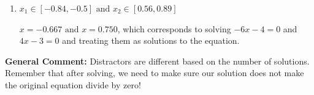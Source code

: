 \documentclass{extbook}[14pt]
\begin{document}
\begin{enumerate}
{\begin{enumerate}[label=\Alph*.]
* The equation leads to solving $19x^{2} +15 x + 16=0$, which leads to complex solutions. This is the correct option.
\item \( x_1 \in [-0.84, -0.5] \text{ and } x_2 \in [0.56,0.89] \)

$x = -0.667 \text{ and } x = 0.750$, which corresponds to solving $-6x -4 = 0$ and $4x -3 = 0$ and treating them as solutions to the equation.
\end{enumerate}

\textbf{General Comment:} Distractors are different based on the number of solutions. Remember that after solving, we need to make sure our solution does not make the original equation divide by zero!
}
\end{enumerate}
\end{document}
